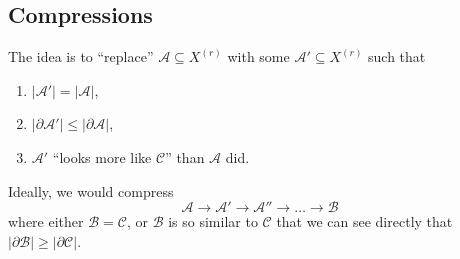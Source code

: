 \documentclass[a4paper]{article}
\newcommand{\shadow}{\partial}
\begin{document}
\subsection{Compressions}

The idea is to ``replace'' \(\mathcal A \subseteq X^{(r)}\) with some \(\mathcal A' \subseteq X^{(r)}\) such that
\begin{enumerate}
\item \(|\mathcal A'| = |\mathcal A|\),
\item \(|\shadow \mathcal A'| \leq |\shadow \mathcal A|\),
\item \(\mathcal A'\) ``looks more like \(\mathcal C\)'' than \(\mathcal A\) did.
\end{enumerate}

Ideally, we would compress
\[
  \mathcal A \to \mathcal A' \to \mathcal A'' \to \dots \to \mathcal B
\]
where either \(\mathcal B = \mathcal C\), or \(\mathcal B\) is so similar to \(\mathcal C\) that we can see directly that \(|\shadow \mathcal B| \geq |\shadow \mathcal C|\).







\printindex
\end{document}

